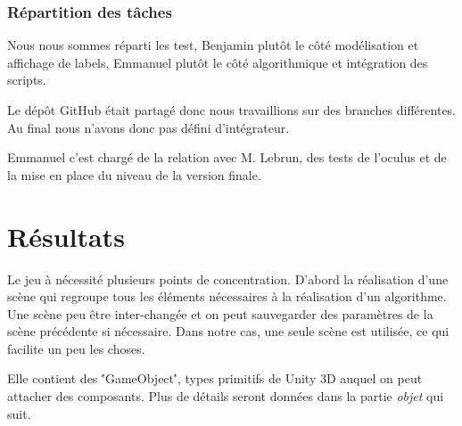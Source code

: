 \documentclass[a4paper,11pt]{myreport}
\begin{document}
\subsection{Répartition des tâches}
\par Nous nous sommes réparti les test, Benjamin plutôt le côté modélisation et affichage de labels, Emmanuel plutôt le côté algorithmique et intégration des scripts.
\par Le dépôt GitHub était partagé donc nous travaillions sur des branches différentes. Au final nous n'avons donc pas défini d'intégrateur.
\par Emmanuel c'est chargé de la relation avec M. Lebrun, des tests de l'oculus et de la mise en place du niveau de la version finale.

\newpage

\chapter{Résultats}
\par Le jeu à nécessité plusieurs points de concentration. D'abord la réalisation d'une scène qui regroupe tous les éléments nécessaires à la réalisation d'un algorithme. Une scène peu être inter-changée et on peut sauvegarder des paramètres de la scène précédente si nécessaire. Dans notre cas, une seule scène est utilisée, ce qui facilite un peu les choses. 
\par Elle contient des \''GameObject\'', types primitifs de Unity 3D auquel on peut attacher des composants. Plus de détails seront données dans la partie \textit{objet} qui suit.
\end{document}
